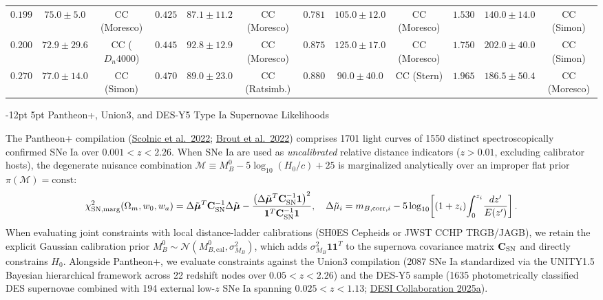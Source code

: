 \documentclass[11pt,letterpaper]{article}
\makeatletter
\renewcommand{\subsection}{\@startsection{subsection}{2}{\z@}%
  {-12pt \@plus -3pt \@minus -1pt}%
  {5pt \@plus 1pt}%
  {\normalfont\large\bfseries\color{tealaccent}}}
\makeatother
\begin{document}
\begin{table}[!htbp]
{\begin{tabular}{ccc|ccc|ccc|ccc}
$0.199$ & $75.0 \pm 5.0$ & CC (Moresco) & $0.425$ & $87.1 \pm 11.2$ & CC (Moresco) & $0.781$ & $105.0 \pm 12.0$ & CC (Moresco) & $1.530$ & $140.0 \pm 14.0$ & CC (Simon) \\
$0.200$ & $72.9 \pm 29.6$ & CC ($D_n4000$) & $0.445$ & $92.8 \pm 12.9$ & CC (Moresco) & $0.875$ & $125.0 \pm 17.0$ & CC (Moresco) & $1.750$ & $202.0 \pm 40.0$ & CC (Simon) \\
$0.270$ & $77.0 \pm 14.0$ & CC (Simon) & $0.470$ & $89.0 \pm 23.0$ & CC (Ratsimb.) & $0.880$ & $90.0 \pm 40.0$ & CC (Stern) & $1.965$ & $186.5 \pm 50.4$ & CC (Moresco) \\
\bottomrule
\end{tabular}%
}
\end{table}

\subsection{Pantheon+, Union3, and DES-Y5 Type Ia Supernovae Likelihoods}

The Pantheon+ compilation (\href{https://arxiv.org/abs/2112.03863}{Scolnic et al.\ 2022}; \href{https://arxiv.org/abs/2202.04077}{Brout et al.\ 2022}) comprises 1701 light curves of 1550 distinct spectroscopically confirmed SNe Ia over $0.001 < z < 2.26$. When SNe Ia are used as \emph{uncalibrated} relative distance indicators ($z > 0.01$, excluding calibrator hosts), the degenerate nuisance combination $\mathcal{M} \equiv M_B^0 - 5\log_{10}(H_0/c) + 25$ is marginalized analytically over an improper flat prior $\pi(\mathcal{M}) = \text{const}$:
\begin{equation}
    \chi^2_{\text{SN,marg}}(\Omega_m, w_0, w_a) = \Delta\tilde{\boldsymbol{\mu}}^T \mathbf{C}_{\rm SN}^{-1} \Delta\tilde{\boldsymbol{\mu}} - \frac{\left(\Delta\tilde{\boldsymbol{\mu}}^T \mathbf{C}_{\rm SN}^{-1} \mathbf{1}\right)^2}{\mathbf{1}^T \mathbf{C}_{\rm SN}^{-1} \mathbf{1}}, \quad \Delta\tilde{\mu}_i = m_{B,\text{corr},i} - 5\log_{10}\!\left[(1+z_i)\!\int_0^{z_i}\!\frac{dz'}{E(z')}\right].
    \label{eq:chi2_sn_marg}
\end{equation}
When evaluating joint constraints with local distance-ladder calibrations (SH0ES Cepheids or JWST CCHP TRGB/JAGB), we retain the explicit Gaussian calibration prior $M_B^0 \sim \mathcal{N}(M_{B,\text{cal}}^0, \sigma_{M_B}^2)$, which adds $\sigma_{M_B}^2 \mathbf{1}\mathbf{1}^T$ to the supernova covariance matrix $\mathbf{C}_{\rm SN}$ and directly constrains $H_0$. Alongside Pantheon+, we evaluate constraints against the Union3 compilation (2087 SNe Ia standardized via the UNITY1.5 Bayesian hierarchical framework across 22 redshift nodes over $0.05 < z < 2.26$) and the DES-Y5 sample (1635 photometrically classified DES supernovae combined with 194 external low-$z$ SNe Ia spanning $0.025 < z < 1.13$; \href{https://arxiv.org/abs/2503.14738}{DESI Collaboration 2025a}).
\end{document}
